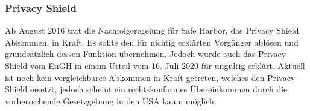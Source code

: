 \subsubsection{Privacy Shield}
    Ab August 2016 trat die Nachfolgeregelung für Safe Harbor, das Privacy Shield Abkommen, in Kraft. Es sollte den für nichtig erklärten Vorgänger ablösen und grundsätzlich dessen Funktion übernehmen. Jedoch wurde auch das Privacy Shield vom EuGH in einem Urteil vom 16. Juli 2020 für ungültig erklärt. Aktuell ist noch kein vergleichbares Abkommen in Kraft getreten, welches den Privacy Shield ersetzt, jedoch scheint ein rechtskonformes Übereinkommen durch die vorherrschende Gesetzgebung in den USA kaum möglich.
\vfill
